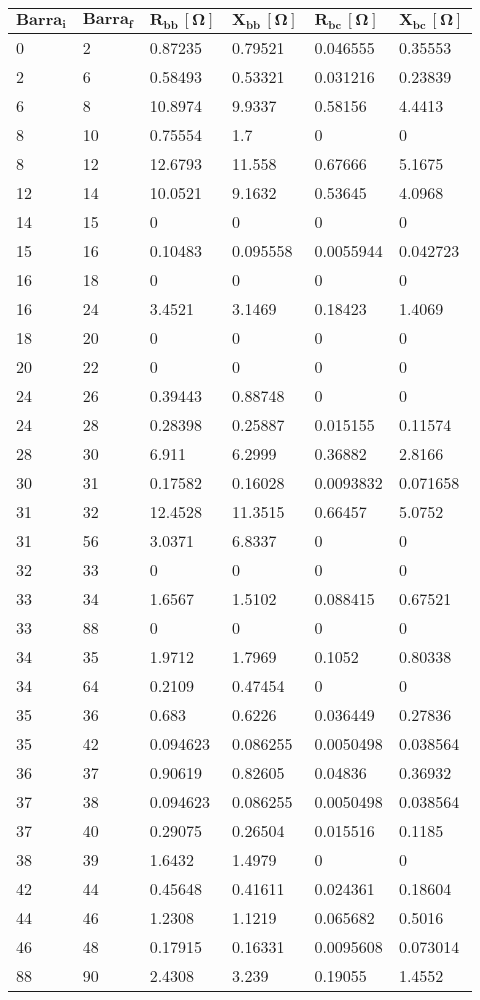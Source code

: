 \begin{tabular}{llllll}
\toprule
\textbf{$\mathbf{Barra_i}$}&\textbf{$\mathbf{Barra_f}$}&\textbf{$\mathbf{R_{bb}\,[\Omega]}$}&\textbf{$\mathbf{X_{bb}\,[\Omega]}$}&\textbf{$\mathbf{R_{bc}\,[\Omega]}$}&\textbf{$\mathbf{X_{bc}\,[\Omega]}$}\\
\midrule
0&2&0.87235&0.79521&0.046555&0.35553\\
2&6&0.58493&0.53321&0.031216&0.23839\\
6&8&10.8974&9.9337&0.58156&4.4413\\
8&10&0.75554&1.7&0&0\\
8&12&12.6793&11.558&0.67666&5.1675\\
12&14&10.0521&9.1632&0.53645&4.0968\\
14&15&0&0&0&0\\
15&16&0.10483&0.095558&0.0055944&0.042723\\
16&18&0&0&0&0\\
16&24&3.4521&3.1469&0.18423&1.4069\\
18&20&0&0&0&0\\
20&22&0&0&0&0\\
24&26&0.39443&0.88748&0&0\\
24&28&0.28398&0.25887&0.015155&0.11574\\
28&30&6.911&6.2999&0.36882&2.8166\\
30&31&0.17582&0.16028&0.0093832&0.071658\\
31&32&12.4528&11.3515&0.66457&5.0752\\
31&56&3.0371&6.8337&0&0\\
32&33&0&0&0&0\\
33&34&1.6567&1.5102&0.088415&0.67521\\
33&88&0&0&0&0\\
34&35&1.9712&1.7969&0.1052&0.80338\\
34&64&0.2109&0.47454&0&0\\
35&36&0.683&0.6226&0.036449&0.27836\\
35&42&0.094623&0.086255&0.0050498&0.038564\\
36&37&0.90619&0.82605&0.04836&0.36932\\
37&38&0.094623&0.086255&0.0050498&0.038564\\
37&40&0.29075&0.26504&0.015516&0.1185\\
38&39&1.6432&1.4979&0&0\\
42&44&0.45648&0.41611&0.024361&0.18604\\
44&46&1.2308&1.1219&0.065682&0.5016\\
46&48&0.17915&0.16331&0.0095608&0.073014\\
88&90&2.4308&3.239&0.19055&1.4552\\
\bottomrule
\end{tabular}
